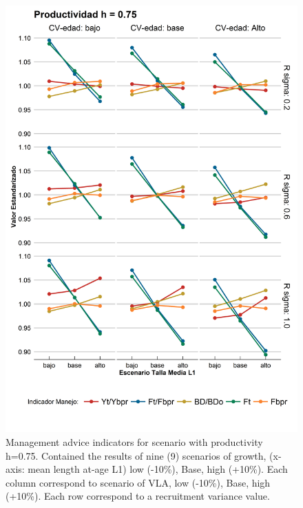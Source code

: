 \documentclass[11pt,letter,]{article}
\begin{document}
\begin{figure}[hbtp]
	\begin{center}
\includegraphics[width=0.70\columnwidth]{figures/steepness-75-var.png}
  \end{center}
\caption{Management advice indicators for scenario with productivity h=0.75. Contained the results of nine (9) scenarios of growth, (x-axis: mean length at-age L1) low (-10\%), Base, high (+10\%). Each column correspond to scenario of VLA, low (-10\%), Base, high (+10\%). Each row correspond to a recruitment variance value.}
\label{figure1}
\end{figure}
\end{document}
